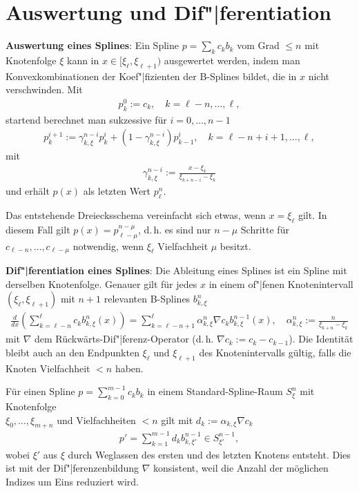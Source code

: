 \section{%
    Auswertung und Dif"|ferentiation%
}

\textbf{Auswertung eines Splines}:
Ein Spline $p = \sum_k c_k b_k$ vom Grad $\le n$ mit Knotenfolge $\xi$ kann in
$x \in [\xi_\ell, \xi_{\ell+1})$ ausgewertet werden, indem man
Konvexkombinationen der Koef"|fizienten der B-Splines bildet, die in $x$ nicht verschwinden.
Mit
\begin{align*}
    p_k^0 := c_k,\quad
    k = \ell - n, \dotsc, \ell,
\end{align*}
startend berechnet man sukzessive für $i = 0, \dotsc, n - 1$
\begin{align*}
    p_k^{i+1} := \gamma_{k,\xi}^{n-i} p_k^i + (1 - \gamma_{k,\xi}^{n-i}) p_{k-1}^i,\quad
    k = \ell - n + i + 1, \dotsc, \ell,
\end{align*}
mit
\begin{align*}
    \gamma_{k,\xi}^{n-i} := \frac{x - \xi_k}{\xi_{k+n-i} - \xi_k}
\end{align*}
und erhält $p(x)$ als letzten Wert $p_\ell^n$.

Das entstehende Dreiecksschema vereinfacht sich etwas, wenn $x = \xi_\ell$ gilt.
In diesem Fall gilt $p(x) = p_{\ell-\mu}^{n-\mu}$, d.\,h.
es sind nur $n - \mu$ Schritte für $c_{\ell-n}, \dotsc, c_{\ell-\mu}$ notwendig,
wenn $\xi_\ell$ Vielfachheit $\mu$ besitzt.

\linie
\pagebreak

\textbf{Dif"|ferentiation eines Splines}:
Die Ableitung eines Splines ist ein Spline mit derselben Knotenfolge.
Genauer gilt für jedes $x$ in einem of"|fenen Knotenintervall $(\xi_\ell, \xi_{\ell+1})$
mit $n + 1$ relevanten B-Splines $b_{k,\xi}^n$
\begin{align*}
    \frac{d}{dx} \left(\sum_{k=\ell-n}^\ell c_k b_{k,\xi}^n(x)\right)
    = \sum_{k=\ell-n+1}^\ell \alpha_{k,\xi}^n \nabla c_k b_{k,\xi}^{n-1}(x),\quad
    \alpha_{k,\xi}^n := \frac{n}{\xi_{k+n} - \xi_k}
\end{align*}
mit $\nabla$ dem Rückwärts-Dif"|ferenz-Operator (d.\,h. $\nabla c_k := c_k - c_{k-1}$).
Die Identität bleibt auch an den Endpunkten $\xi_\ell$ und $\xi_{\ell+1}$ des Knotenintervalls
gültig, falls die Knoten Vielfachheit $< n$ haben.

Für einen Spline $p = \sum_{k=0}^{m-1} c_k b_k$ in einem Standard-Spline-Raum $S_\xi^n$ mit
Knotenfolge\\
$\xi_0, \dotsc, \xi_{m+n}$ und Vielfachheiten $< n$ gilt
mit $d_k := \alpha_{k,\xi} \nabla c_k$
\begin{align*}
    p' = \sum_{k=1}^{m-1} d_k b_{k,\xi'}^{n-1} \in S_{\xi'}^{n-1},
\end{align*}
wobei $\xi'$ aus $\xi$ durch Weglassen des ersten und des letzten Knotens entsteht.
Dies ist mit der Dif"|ferenzenbildung $\nabla$ konsistent, weil die Anzahl der möglichen Indizes
um Eins reduziert wird.


